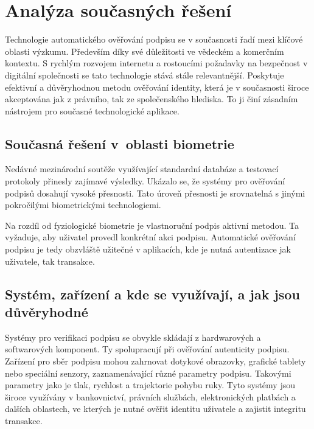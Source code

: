 \chapter{Analýza současných řešení}
Technologie automatického ověřování podpisu se v současnosti řadí mezi klíčové oblasti výzkumu.                                                         %
Především díky své důležitosti ve vědeckém a komerčním kontextu.                                                                                        %
S rychlým rozvojem internetu a rostoucími požadavky na bezpečnost v digitální společnosti se tato technologie stává stále relevantnější.                %
Poskytuje efektivní a důvěryhodnou metodu ověřování identity, která je v současnosti široce akceptována jak z právního, tak ze společenského hlediska.  %
To ji činí zásadním nástrojem pro současné technologické aplikace.                                                                                      %

\section{Současná řešení v~oblasti biometrie}
Nedávné mezinárodní soutěže využívající standardní databáze a testovací protokoly přinesly zajímavé výsledky.   %
Ukázalo se, že systémy pro ověřování podpisů dosahují vysoké přesnosti.                                         %
Tato úroveň přesnosti je srovnatelná s jinými pokročilými biometrickými technologiemi.                          %

Na rozdíl od fyziologické biometrie je vlastnoruční podpis aktivní metodou.                                                   %
Ta vyžaduje, aby uživatel provedl konkrétní akci podpisu.                                                                     %
Automatické ověřování podpisu je tedy obzvláště užitečné v aplikacích, kde je nutná autentizace jak uživatele, tak transakce. %

\section{Systém, zařízení a kde se využívají, a jak jsou důvěryhodné}
Systémy pro verifikaci podpisu se obvykle skládají z hardwarových a softwarových komponent. 
Ty spolupracují při ověřování autenticity podpisu. 
Zařízení pro sběr podpisu mohou zahrnovat dotykové obrazovky, grafické tablety nebo speciální senzory, zaznamenávající různé parametry podpisu.
Takovými parametry jako je tlak, rychlost a trajektorie pohybu ruky. 
Tyto systémy jsou široce využívány v bankovnictví, právních službách, elektronických platbách a dalších oblastech, ve kterých je nutné ověřit identitu uživatele a zajistit integritu transakce. %

